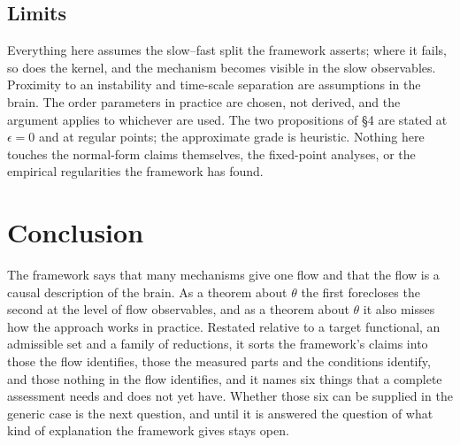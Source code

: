 \documentclass[10pt]{article}
\begin{document}
\subsection{Limits}
Everything here assumes the slow--fast split the framework asserts; where it fails, so does the kernel, and the mechanism becomes visible in the slow observables. Proximity to an instability and time-scale separation are assumptions in the brain. The order parameters in practice are chosen, not derived, and the argument applies to whichever are used. The two propositions of \S4 are stated at $\epsilon=0$ and at regular points; the approximate grade is heuristic. Nothing here touches the normal-form claims themselves, the fixed-point analyses, or the empirical regularities the framework has found.

\section{Conclusion}
The framework says that many mechanisms give one flow and that the flow is a causal description of the brain. As a theorem about $\theta$ the first forecloses the second at the level of flow observables, and as a theorem about $\theta$ it also misses how the approach works in practice. Restated relative to a target functional, an admissible set and a family of reductions, it sorts the framework's claims into those the flow identifies, those the measured parts and the conditions identify, and those nothing in the flow identifies, and it names six things that a complete assessment needs and does not yet have. Whether those six can be supplied in the generic case is the next question, and until it is answered the question of what kind of explanation the framework gives stays open.

\printbibliography
\end{document}
